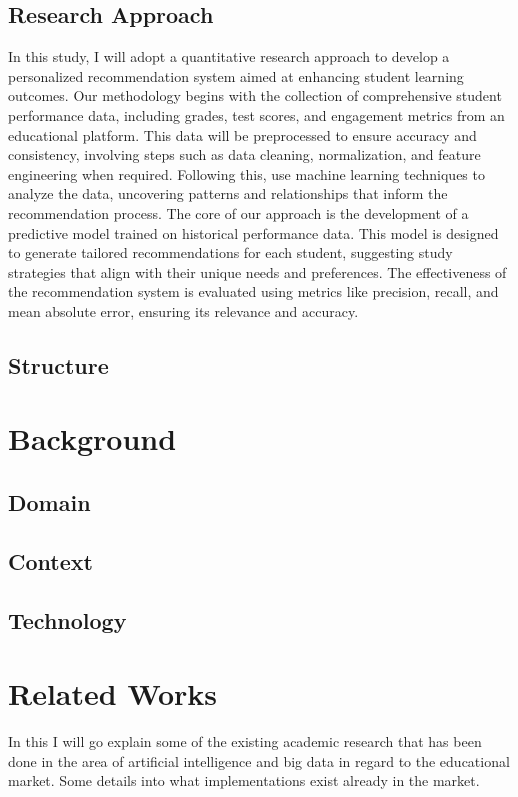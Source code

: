 \documentclass{imc-inf}
\begin{document}
\section{Research Approach }
In this study, I will adopt a quantitative research approach to develop a personalized recommendation system aimed at enhancing student learning outcomes. Our methodology begins with the collection of comprehensive student performance data, including grades, test scores, and engagement metrics from an educational platform. This data will be preprocessed to ensure accuracy and consistency, involving steps such as data cleaning, normalization, and feature engineering when required. Following this, use machine learning techniques to analyze the data, uncovering patterns and relationships that inform the recommendation process. The core of our approach is the development of a predictive model trained on historical performance data.  This model is designed to generate tailored recommendations for each student, suggesting study strategies that align with their unique needs and preferences. The effectiveness of the recommendation system is evaluated using metrics like precision, recall, and mean absolute error, ensuring its relevance and accuracy.
\section{Structure}


\chapter{Background}

\section{Domain }

\section{Context }

\section{Technology }





\chapter{Related Works}
In this I will go explain some of the existing academic research that has been done in the area of artificial intelligence and big data in regard to the educational market. Some details into what implementations exist already in the market. 
\end{document}
